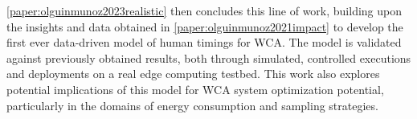 \cref{paper:olguinmunoz2023realistic} then concludes this line of work, building upon the insights and data obtained in \cref{paper:olguinmunoz2021impact} to develop the first ever data-driven model of human timings for \gls{WCA}.
The model is validated against previously obtained results, both through simulated, controlled executions and deployments on a real edge computing testbed.
This work also explores potential implications of this model for \gls{WCA} system optimization potential, particularly in the domains of energy consumption and sampling strategies.
